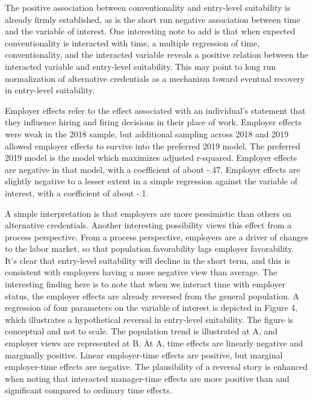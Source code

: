 \documentclass[AER]{/Users/zyl357/Documents/GitHub/research-dissertation-case-for-alt-ed/papers/alt-ed-survey/aea-latex-templates/AEA}
\begin{document}
The positive association between conventionality and entry-level
suitability is already firmly established, as is the short run negative
association between time and the variable of interest. One interesting
note to add is that when expected conventionality is interacted with time,
a multiple regression of time, conventionality, and the interacted
variable reveals a positive relation between the interacted variable and
entry-level suitability. This may point to long run normalization of
alternative credentials as a mechanism toward eventual recovery in
entry-level suitability.

Employer effects refer to the effect associated with an individual’s
statement that they influence hiring and firing decisions in their place
of work. Employer effects were weak in the 2018 sample, but additional
sampling across 2018 and 2019 allowed employer effects to survive into the
preferred 2019 model. The preferred 2019 model is the model which
maximizes adjusted r-squared. Employer effects are negative in that model,
with a coefficient of about -.47. Employer effects are slightly negative
to a lesser extent in a simple regression against the variable of
interest, with a coefficient of about -.1.

A simple interpretation is that employers are more pessimistic than others
on alternative credentials. Another interesting possibility views this
effect from a process perspective. From a process perspective, employers
are a driver of changes to the labor market, so that population
favorability lags employer favorability. It’s clear that entry-level
suitability will decline in the short term, and this is consistent with
employers having a more negative view than average. The interesting
finding here is to note that when we interact time with employer status,
the employer effects are already reversed from the general population. A
regression of four parameters on the variable of interest is depicted in
Figure 4, which illustrates a hypothetical reversal in entry-level
suitability. The figure is conceptual and not to scale. The population
trend is illustrated at A, and employer views are represented at B. At A,
time effects are linearly negative and marginally positive. Linear
employer-time effects are positive, but marginal employer-time effects are
negative. The plausibility of a reversal story is enhanced when noting
that interacted manager-time effects are more positive than and
significant compared to ordinary time effects.

\end{document}
